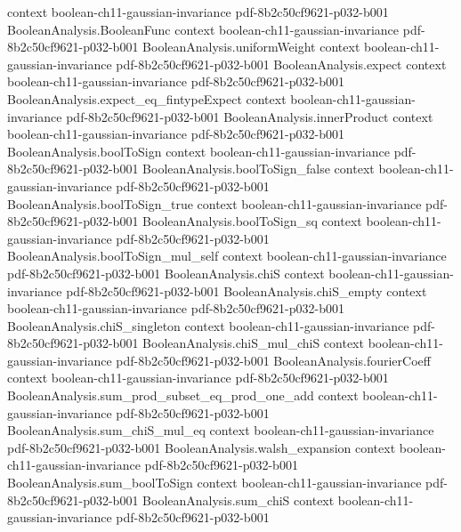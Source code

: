\begin{theorem}
  {context}
  {boolean-ch11-gaussian-invariance}
  {pdf-8b2c50cf9621-p032-b001}
\proofstep
  {BooleanAnalysis.BooleanFunc}
  {context}
  {boolean-ch11-gaussian-invariance}
  {pdf-8b2c50cf9621-p032-b001}
\proofstep
  {BooleanAnalysis.uniformWeight}
  {context}
  {boolean-ch11-gaussian-invariance}
  {pdf-8b2c50cf9621-p032-b001}
\proofstep
  {BooleanAnalysis.expect}
  {context}
  {boolean-ch11-gaussian-invariance}
  {pdf-8b2c50cf9621-p032-b001}
\proofstep
  {BooleanAnalysis.expect_eq_fintypeExpect}
  {context}
  {boolean-ch11-gaussian-invariance}
  {pdf-8b2c50cf9621-p032-b001}
\proofstep
  {BooleanAnalysis.innerProduct}
  {context}
  {boolean-ch11-gaussian-invariance}
  {pdf-8b2c50cf9621-p032-b001}
\proofstep
  {BooleanAnalysis.boolToSign}
  {context}
  {boolean-ch11-gaussian-invariance}
  {pdf-8b2c50cf9621-p032-b001}
\proofstep
  {BooleanAnalysis.boolToSign_false}
  {context}
  {boolean-ch11-gaussian-invariance}
  {pdf-8b2c50cf9621-p032-b001}
\proofstep
  {BooleanAnalysis.boolToSign_true}
  {context}
  {boolean-ch11-gaussian-invariance}
  {pdf-8b2c50cf9621-p032-b001}
\proofstep
  {BooleanAnalysis.boolToSign_sq}
  {context}
  {boolean-ch11-gaussian-invariance}
  {pdf-8b2c50cf9621-p032-b001}
\proofstep
  {BooleanAnalysis.boolToSign_mul_self}
  {context}
  {boolean-ch11-gaussian-invariance}
  {pdf-8b2c50cf9621-p032-b001}
\proofstep
  {BooleanAnalysis.chiS}
  {context}
  {boolean-ch11-gaussian-invariance}
  {pdf-8b2c50cf9621-p032-b001}
\proofstep
  {BooleanAnalysis.chiS_empty}
  {context}
  {boolean-ch11-gaussian-invariance}
  {pdf-8b2c50cf9621-p032-b001}
\proofstep
  {BooleanAnalysis.chiS_singleton}
  {context}
  {boolean-ch11-gaussian-invariance}
  {pdf-8b2c50cf9621-p032-b001}
\proofstep
  {BooleanAnalysis.chiS_mul_chiS}
  {context}
  {boolean-ch11-gaussian-invariance}
  {pdf-8b2c50cf9621-p032-b001}
\proofstep
  {BooleanAnalysis.fourierCoeff}
  {context}
  {boolean-ch11-gaussian-invariance}
  {pdf-8b2c50cf9621-p032-b001}
\proofstep
  {BooleanAnalysis.sum_prod_subset_eq_prod_one_add}
  {context}
  {boolean-ch11-gaussian-invariance}
  {pdf-8b2c50cf9621-p032-b001}
\proofstep
  {BooleanAnalysis.sum_chiS_mul_eq}
  {context}
  {boolean-ch11-gaussian-invariance}
  {pdf-8b2c50cf9621-p032-b001}
\proofstep
  {BooleanAnalysis.walsh_expansion}
  {context}
  {boolean-ch11-gaussian-invariance}
  {pdf-8b2c50cf9621-p032-b001}
\proofstep
  {BooleanAnalysis.sum_boolToSign}
  {context}
  {boolean-ch11-gaussian-invariance}
  {pdf-8b2c50cf9621-p032-b001}
\proofstep
  {BooleanAnalysis.sum_chiS}
  {context}
  {boolean-ch11-gaussian-invariance}
  {pdf-8b2c50cf9621-p032-b001}
\proofstep

\end{theorem}
